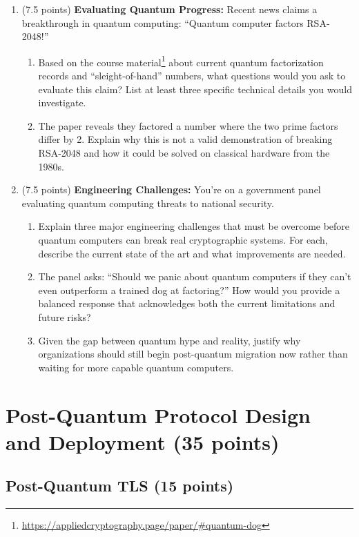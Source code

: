 \documentclass[10pt,a4paper,american]{exam}
\begin{document}
\begin{enumerate}
	\item (7.5 points) \textbf{Evaluating Quantum Progress:}
	      Recent news claims a breakthrough in quantum computing: ``Quantum computer factors RSA-2048!''
	      \begin{enumerate}
		      \item Based on the course material\footnote{\url{https://appliedcryptography.page/paper/\#quantum-dog}} about current quantum factorization records and ``sleight-of-hand'' numbers, what questions would you ask to evaluate this claim? List at least three specific technical details you would investigate.
		      \item The paper reveals they factored a number where the two prime factors differ by 2. Explain why this is not a valid demonstration of breaking RSA-2048 and how it could be solved on classical hardware from the 1980s.
	      \end{enumerate}
	\item (7.5 points) \textbf{Engineering Challenges:}
	      You're on a government panel evaluating quantum computing threats to national security.
	      \begin{enumerate}
		      \item Explain three major engineering challenges that must be overcome before quantum computers can break real cryptographic systems. For each, describe the current state of the art and what improvements are needed.
		      \item The panel asks: ``Should we panic about quantum computers if they can't even outperform a trained dog at factoring?'' How would you provide a balanced response that acknowledges both the current limitations and future risks?
		      \item Given the gap between quantum hype and reality, justify why organizations should still begin post-quantum migration now rather than waiting for more capable quantum computers.
	      \end{enumerate}
\end{enumerate}

\section{Post-Quantum Protocol Design and Deployment (35 points)}

\subsection{Post-Quantum TLS (15 points)}
\end{document}
